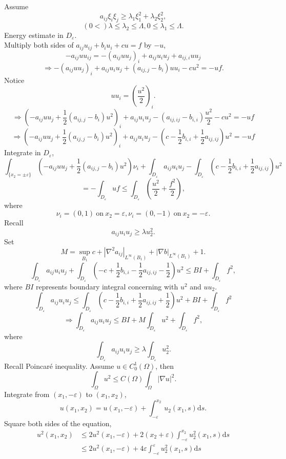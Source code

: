 \documentclass[12pt]{article}
\begin{document}
Assume
\[ a_{ij}\xi_i\xi_j \ge \lambda_1\xi_1^2 + \lambda_2\xi_2^2, \]
\[ (0 < )\lambda \le \lambda_2 \le \Lambda, 0 \le \lambda_1 \le \Lambda. \]
Energy estimate in $D_\varepsilon$.\\
Multiply both sides of $ a_{ij}u_{ij} + b_iu_i + cu = f $ by $-u$,
\[ -a_{ij}uu_{ij} = -(a_{ij}uu_j)_i + a_{ij}u_iu_j + a_{ij, i}uu_j \]
\[ \Rightarrow -(a_{ij}uu_j)_i + a_{ij}u_iu_j + (a_{ij, j} - b_i)uu_i - cu^2 = -uf. \]
Notice
\[ uu_i = \left( \frac{u^2}{2} \right)_i. \]
\[ \Rightarrow \left(-a_{ij}uu_j + \frac{1}{2}(a_{ij, j} - b_i)u^2\right)_i + a_{ij}u_iu_j - (a_{ij, ij} - b_{i, i})\frac{u^2}{2} - cu^2 = -uf \]
\[ \Rightarrow \left(-a_{ij}uu_j + \frac{1}{2}(a_{ij, j} - b_i)u^2\right)_i + a_{ij}u_iu_j - \left(c - \frac{1}{2}b_{i, i} + \frac{1}{2}a_{ij, ij}\right)u^2 = -uf \]
Integrate in $ D_\varepsilon $,
\[
\int_{\{ x_2 = \pm \varepsilon \}} \left( -a_{ij}uu_j + \frac{1}{2}(a_{ij, j} - b_i)u^2\right)\nu_i + \int_{D_\varepsilon} a_{ij}u_iu_j - \int_{D_\varepsilon} \left( c-\frac{1}{2}b_{i, i} + \frac{1}{2}a_{ij, ij} \right)u^2 \]
\[= -\int_{D_\varepsilon} uf 
\le \int_{D_\varepsilon} \left(\frac{u^2}{2}+\frac{f^2}{2} \right)
, 
\]
where
\[ \nu_i = (0, 1) \mathrm{\ on\ } x_2 = \varepsilon, \nu_i = (0, -1)\mathrm{\ on\ } x_2 = -\varepsilon . \]
Recall
\[ a_{ij}u_iu_j \ge \lambda u_2^2. \]
Set
\[ M = \sup_{B_1} c + \left|\nabla^2 a_{ij}\right|_{L^\infty(B_1)} + |\nabla b|_{L^\infty(B_1)} + 1. \]
\[ \int_{D_\varepsilon} a_{ij}u_iu_j + \int_{D_\varepsilon} \left( -c + \frac{1}{2}b_{i, i} - \frac{1}{2}a_{ij, ij} - \frac{1}{2} \right)u^2 \le BI + \int_{D_\varepsilon} f^2, \]
where $BI$ represents boundary integral concerning with $ u^2 $ and $ uu_2 $.
\[ \int_{D_\varepsilon}a_{ij}u_iu_j \le \int_{D_\varepsilon} \left( c - \frac{1}{2}b_{i, i} + \frac{1}{2}a_{ij, ij} + \frac{1}{2} \right)u^2 + BI + \int_{D_\varepsilon} f^2 \]
\[ \Rightarrow \int_{D_\varepsilon} a_{ij}u_iu_j \le BI + M\int_{D_\varepsilon}u^2 + \int_{D_\varepsilon} f^2, \]
where 
\[ \int_{D_\varepsilon} a_{ij}u_iu_j \ge \lambda \int_{D_\varepsilon} u^2_2. \]
Recall Poincar\'{e} inequality. Assume $ u \in C_0^1 (\Omega) $, then
\[ \int_\Omega u^2 \le C(\Omega)\int_\Omega |\nabla u|^2. \]
Integrate from $ (x_1, -\varepsilon) $ to $ (x_1, x_2) $,
\[ u(x_1, x_2) = u(x_1, -\varepsilon) + \int_{-\varepsilon}^{x_2} u_2(x_1, s)\mathrm{d}s. \]
Square both sides of the equation,
\begin{align*}
u^2(x_1, x_2) &\le 2u^2(x_1, -\varepsilon) + 2(x_2 + \varepsilon)\int_{-\varepsilon}^{x_2}u^2_2(x_1, s) \mathrm{d}s \\
&\le 2u^2(x_1, -\varepsilon) + 4\varepsilon \int_{-\varepsilon}^{\varepsilon} u^2_2(x_1, s)\mathrm{d}s 
\end{align*}
\end{document}

